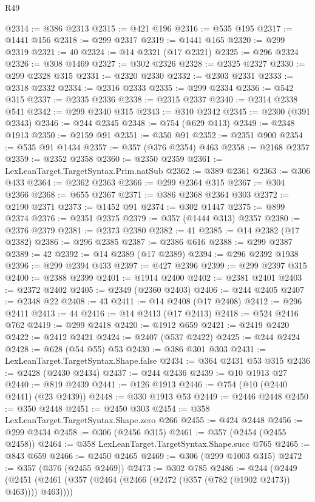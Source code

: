 \begin{lexlean}{R49}
\begin{coremodule}
@2314 := @386 @2313
@2315 := @421 @196
@2316 := @535 @195
@2317 := @1441 @156
@2318 := @299 @2317
@2319 := @1441 @165
@2320 := @299 @2319
@2321 := 40
@2324 := @14 @2321 (@17 @2321)
@2325 := @296 @2324
@2326 := @308 @1469
@2327 := @302 @2326
@2328 := @2325 @2327
@2330 := @299 @2328 @315
@2331 := @2320 @2330
@2332 := @2303 @2331
@2333 := @2318 @2332
@2334 := @2316 @2333
@2335 := @299 @2334
@2336 := @542 @315
@2337 := @2335 @2336
@2338 := @2315 @2337
@2340 := @2314 @2338 @541
@2342 := @299 @2340 @315
@2343 := @310 @2342
@2345 := @2300 (@391 @2343)
@2346 := @244 @2345
@2348 := @754 (@629 @113)
@2349 := @2348 @1913
@2350 := @2159 @91
@2351 := @350 @91
@2352 := @2351 @900
@2354 := @535 @91 @1434
@2357 := @357 (@376 @2354) @463
@2358 := @2168 @2357
@2359 := @2352 @2358
@2360 := @2350 @2359
@2361 := LexLeanTarget.TargetSyntax.Prim.natSub
@2362 := @389 @2361
@2363 := @306 @433
@2364 := @2362 @2363
@2366 := @299 @2364 @315
@2367 := @304 @2366
@2368 := @655 @2367
@2371 := @386 @2368 @2364 @303
@2372 := @2190 @2371
@2373 := @1452 @91
@2374 := @302 @1447
@2375 := @899 @2374
@2376 := @2351 @2375
@2379 := @357 (@1444 @313) @2357
@2380 := @2376 @2379
@2381 := @2373 @2380
@2382 := 41
@2385 := @14 @2382 (@17 @2382)
@2386 := @296 @2385
@2387 := @2386 @616
@2388 := @299 @2387
@2389 := 42
@2392 := @14 @2389 (@17 @2389)
@2394 := @296 @2392 @1938
@2396 := @299 @2394 @433
@2397 := @427 @2396
@2399 := @299 @2397 @315
@2400 := @2388 @2399
@2401 := @1914 @2400
@2402 := @2381 @2401
@2403 := @2372 @2402
@2405 := @2349 (@2360 @2403)
@2406 := @244 @2405
@2407 := @2348 @22
@2408 := 43
@2411 := @14 @2408 (@17 @2408)
@2412 := @296 @2411
@2413 := 44
@2416 := @14 @2413 (@17 @2413)
@2418 := @524 @2416 @762
@2419 := @299 @2418
@2420 := @1912 @659
@2421 := @2419 @2420
@2422 := @2412 @2421
@2424 := @2407 (@537 @2422)
@2425 := @244 @2424
@2428 := @628 (@54 @55) @53
@2430 := @386 @301 @303
@2431 := LexLeanTarget.TargetSyntax.Shape.false
@2434 := @364 @2431 @53 @315
@2436 := @2428 (@2430 @2434)
@2437 := @244 @2436
@2439 := @10 @1913 @27
@2440 := @819 @2439
@2441 := @126 @1913
@2446 := @754 (@10 (@2440 @2441) (@23 @2439))
@2448 := @330 @1913 @53
@2449 := @2446 @2448
@2450 := @350 @2448
@2451 := @2450 @303
@2454 := @358 LexLeanTarget.TargetSyntax.Shape.zero @266
@2455 := @424 @2448
@2456 := @299 @2434
@2458 := @306 (@2456 @315)
@2461 := @357 (@2454 (@2455 @2458))
@2464 := @358 LexLeanTarget.TargetSyntax.Shape.succ @765
@2465 := @843 @659
@2466 := @2450 @2465
@2469 := @306 (@299 @1003 @315)
@2472 := @357 (@376 (@2455 @2469))
@2473 := @302 @785
@2486 := @244
    (@2449 (@2451 (@2461 (@357 (@2464 (@2466 (@2472 (@357 (@782 (@1902 @2473)) @463)))) @463))))

\end{coremodule}
\end{lexlean}
